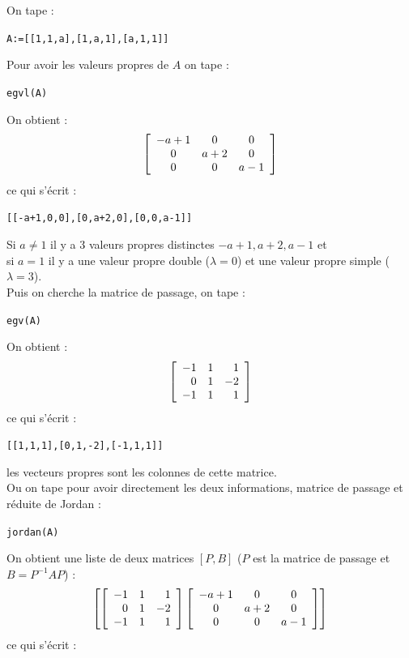 \documentclass{article}
\begin{document}
\begin{enumerate}
On tape :
\begin{center}
 {\tt A:=[[1,1,a],[1,a,1],[a,1,1]] }
\end{center}
Pour avoir les valeurs propres de $A$ on tape :
\begin{center}
{\tt egvl(A)}
\end{center}
On obtient :
$$ {\tt \left[ 
\begin{array}{ccc}
-a+1 & 0 & 0\\
0 & a+2 & 0\\
0 & 0 & a-1
\end{array}
\right] }$$
ce qui s'\'ecrit :
\begin{center}{\tt [[-a+1,0,0],[0,a+2,0],[0,0,a-1]]}\end{center}
Si $a \neq 1$ il y a 3 valeurs propres distinctes $-a+1,a+2,a-1$ et\\
 si $a=1$ il y a une valeur propre double ($\lambda=0$) et une valeur propre 
simple  ($\lambda=3$).\\
Puis on cherche la matrice de passage, on tape :
\begin{center}
{\tt egv(A)}
\end{center}
On obtient :
$$ {\tt \left[ 
\begin{array}{rrr}
-1 & 1 & 1\\
0 & 1 & -2\\
-1 & 1 & 1
\end{array}
\right] }$$
ce qui s'\'ecrit : 
\begin{center}
{\tt [[1,1,1],[0,1,-2],[-1,1,1]]}
\end{center}
les vecteurs propres sont les colonnes de cette matrice.\\
Ou on tape pour avoir directement les deux informations, matrice de passage et r\'eduite de Jordan :
\begin{center}
{\tt jordan(A)}
\end{center}
On obtient une liste de deux matrices $[P,B]$ ($P$ est la matrice de passage et
$B=P^{-1}AP$) :
$$ {\tt \left[ \left[ 
\begin{array}{rrr}
-1 & 1 & 1\\
0 & 1 & -2\\
-1 & 1 & 1
\end{array}
\right] 
\left[\begin{array}{ccc}
-a+1 & 0 & 0\\
0 & a+2 & 0\\
0 & 0 & a-1
\end{array}
\right] 
\right]}$$
ce qui s'\'ecrit :
\begin{center}

\end{center}
\end{enumerate}
\end{document}
